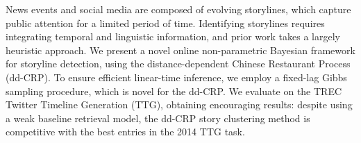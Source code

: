 News events and social media are composed of evolving storylines, which capture public attention for a limited period of time. Identifying storylines requires integrating temporal and linguistic information, and prior work takes a largely heuristic approach. We present a novel online non-parametric Bayesian framework for storyline detection, using the distance-dependent Chinese Restaurant Process (dd-CRP). To ensure efficient linear-time inference, we employ a fixed-lag Gibbs sampling procedure, which is novel for the dd-CRP. We evaluate on the TREC Twitter Timeline Generation (TTG), obtaining encouraging results: despite using a weak baseline retrieval model, the dd-CRP story clustering method is competitive with the best entries in the 2014 TTG task.
